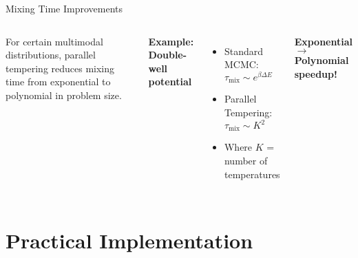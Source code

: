 \documentclass[aspectratio=169]{beamer}
\begin{document}
\begin{frame}{Mixing Time Improvements}
\begin{columns}
\begin{theorem}[Woodard et al., 2009]
For certain multimodal distributions, parallel tempering reduces mixing time from exponential to polynomial in problem size.
\end{theorem}

\textbf{Example: Double-well potential}
\begin{itemize}
    \item Standard MCMC: $\tau_{\text{mix}} \sim e^{\beta \Delta E}$
    \item Parallel Tempering: $\tau_{\text{mix}} \sim K^2$
    \item Where $K$ = number of temperatures
\end{itemize}


\textcolor{copenhagenred}{\textbf{Exponential $\to$ Polynomial speedup!}}
\end{columns}
\end{frame}

\section{Practical Implementation}
\end{document}
